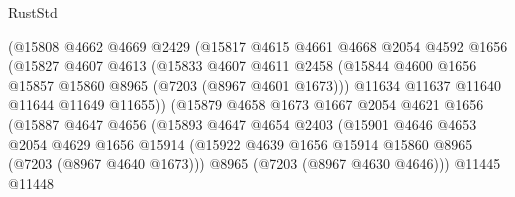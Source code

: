 \begin{lexlean}{RustStd}
\begin{coremodule}
                          (@15808
                            @4662
                            @4669
                            @2429
                            (@15817
                              @4615
                              @4661
                              @4668
                              @2054
                              @4592
                              @1656
                              (@15827
                                @4607
                                @4613
                                (@15833
                                  @4607
                                  @4611
                                  @2458
                                  (@15844
                                    @4600
                                    @1656
                                    @15857
                                    @15860
                                    @8965
                                    (@7203 (@8967 @4601 @1673)))
                                  @11634
                                  @11637
                                  @11640
                                  @11644
                                  @11649
                                  @11655))
                              (@15879
                                @4658
                                @1673
                                @1667
                                @2054
                                @4621
                                @1656
                                (@15887
                                  @4647
                                  @4656
                                  (@15893
                                    @4647
                                    @4654
                                    @2403
                                    (@15901
                                      @4646
                                      @4653
                                      @2054
                                      @4629
                                      @1656
                                      @15914
                                      (@15922
                                        @4639
                                        @1656
                                        @15914
                                        @15860
                                        @8965
                                        (@7203 (@8967 @4640 @1673)))
                                      @8965
                                      (@7203 (@8967 @4630 @4646)))
                                    @11445
                                    @11448

\end{coremodule}
\end{lexlean}
